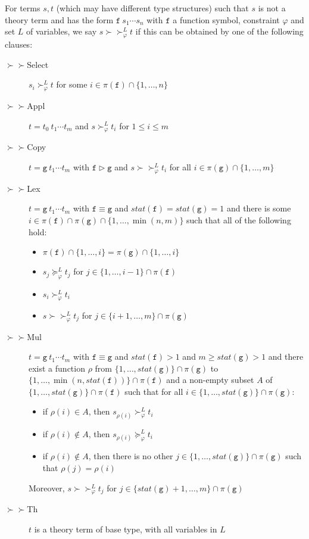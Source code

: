 \documentclass[a4paper,USenglish,cleveref,autoref,thm-restate]{lipics-v2021}
\newcommand{\gtvA}{L}
\newcommand{\geqth}{\succeq_\varphi^\gtvA}
\newcommand{\grth}{\succ_\varphi^\gtvA}
\newcommand{\rpoth}{\succ\!\!\!\succ_\varphi^\gtvA}
\newcommand{\rpo}{\succ\!\!\!\succ}
\newcommand{\grpred}{\rhd}
\newcommand{\eqpred}{\equiv}
\newcommand{\symb}[1]{\mathtt{#1}}
\newcommand{\afun}{\symb{f}}
\newcommand{\bfun}{\symb{g}}
\newcommand{\status}{\mathit{stat}}
\newcommand{\filter}{\pi}
\begin{document}
For terms $s,t$ (which may have different type structures) such that $s$ is not a theory term and
has the form $\afun\ s_1 \cdots s_n$ with $\afun$ a function symbol, constraint $\varphi$ and set
$\gtvA$ of variables, we say $s \rpoth t$ if this can be obtained by one of the following clauses:
\begin{description}
\item[$\rpo$Select] $s_i \grth t$ for some $i \in \filter(\afun) \cap \{1,\dots,n\}$
\item[$\rpo$Appl] $t = t_0\ t_1 \cdots t_m$ and $s \grth t_i$ for $1 \leq i \leq m$
\item[$\rpo$Copy] $t = \bfun\ t_1 \cdots t_m$ with $\afun \grpred \bfun$ and 
    $s \rpoth t_i$ for all $i \in \filter(\bfun) \cap \{1,\dots,m\}$
\item[$\rpo$Lex] $t = \bfun\ t_1 \cdots t_m$ with $\afun \eqpred \bfun$ and $\status(\afun) =
    \status(\bfun) = 1$ and there is some
    $i \in \filter(\afun) \cap \filter(\bfun) \cap \{1,\dots,\min(n,m)\}$
    such that all of the following hold:
    \begin{itemize}
    \item $\filter(\afun) \cap \{1,\dots,i\} = \filter(\bfun) \cap \{1,\dots,i\}$
    \item $s_j \geqth t_j$ for $j \in \{1,\dots,i-1\} \cap \filter(\afun)$
    \item $s_i \grth t_i$
    \item $s \rpoth t_j$ for $j \in \{i+1,\dots,m\} \cap \filter(\bfun)$
    \end{itemize}
\item[$\rpo$Mul] $t = \bfun\ t_1 \cdots t_m$ with $\afun \eqpred \bfun$ and $\status(\afun) > 1$
    and $m \geq \status(\bfun) > 1$ and there exist a function $\rho$ from
    $\{1,\dots,\status(\bfun)\} \cap \filter(\bfun)$ to
    $\{1,\dots,\min(n,\status(\afun))\} \cap \filter(\afun)$ and a non-empty subset $A$ of
    $\{1,\dots,\status(\bfun)\} \cap \filter(\afun)$ such that for all $i \in
    \{1,\dots,\status(\bfun)\} \cap \filter(\bfun)$:
    \begin{itemize}
    \item if $\rho(i) \in A$, then $s_{\rho(i)} \grth t_i$
    \item if $\rho(i) \notin A$, then $s_{\rho(i)} \geqth t_i$
    \item if $\rho(i) \notin A$, then there is no other $j \in
      \{1,\dots,\status(\bfun)\} \cap \filter(\bfun)$ such that $\rho(j) = \rho(i)$
    \end{itemize}
    Moreover, $s \rpoth t_j$ for $j \in \{\status(\bfun)+1,\dots,m\} \cap \filter(\bfun)$
\item[$\rpo$Th] $t$ is a theory term of base type, with all variables in $\gtvA$
\end{description}
\end{document}
